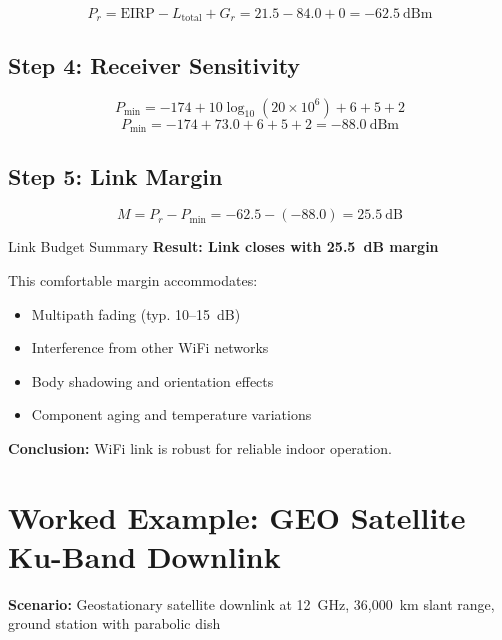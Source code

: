 \begin{equation}
P_r = \text{EIRP} - L_{\text{total}} + G_r = 21.5 - 84.0 + 0 = -62.5~\text{dBm}
\end{equation}

\subsection*{Step 4: Receiver Sensitivity}

\begin{equation}
P_{\text{min}} = -174 + 10\log_{10}(20 \times 10^6) + 6 + 5 + 2
\end{equation}
\begin{equation}
P_{\text{min}} = -174 + 73.0 + 6 + 5 + 2 = -88.0~\text{dBm}
\end{equation}

\subsection*{Step 5: Link Margin}

\begin{equation}
M = P_r - P_{\text{min}} = -62.5 - (-88.0) = 25.5~\text{dB}
\end{equation}

\begin{calloutbox}[colback=green!10,colframe=green!50!black]{Link Budget Summary}
\textbf{Result: Link closes with 25.5~dB margin}

This comfortable margin accommodates:
\begin{itemize}
\item Multipath fading (typ. 10--15~dB)
\item Interference from other WiFi networks
\item Body shadowing and orientation effects
\item Component aging and temperature variations
\end{itemize}

\textbf{Conclusion:} WiFi link is robust for reliable indoor operation.
\end{calloutbox}

\section{Worked Example: GEO Satellite Ku-Band Downlink}

\textbf{Scenario:} Geostationary satellite downlink at 12~GHz, 36,000~km slant range, ground station with parabolic dish

